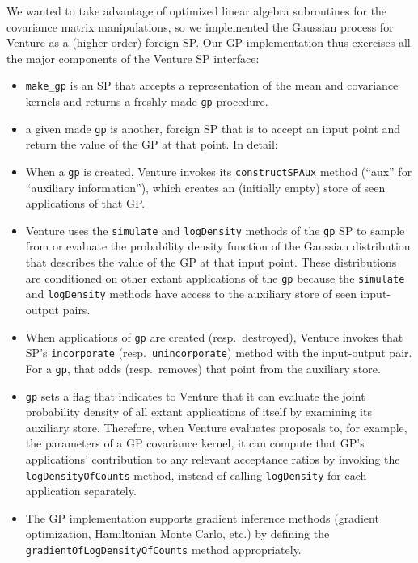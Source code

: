 We wanted to take advantage of optimized linear algebra subroutines
for the covariance matrix manipulations, so we implemented the
Gaussian process for Venture as a (higher-order) foreign \ac{SP}.
Our \ac{GP} implementation thus exercises all the major components of
the Venture \ac{SP} interface:

\begin{itemize}

  \item \texttt{make\_gp} is an \ac{SP} that accepts a representation
  of the mean and covariance kernels and returns a freshly
  made \texttt{gp} procedure.

  \item a given made \texttt{gp} is another, foreign \ac{SP} that
  is to accept an input point and return the value of the \ac{GP} at that
  point.  In detail:

  \item When a \texttt{gp} is created, Venture invokes
  its \texttt{constructSPAux} method (``aux'' for ``auxiliary
  information''), which creates an (initially empty) store of seen
  applications of that \ac{GP}.

  \item Venture uses the \texttt{simulate} and \texttt{logDensity}
  methods of the \texttt{gp} \ac{SP} to sample from or evaluate the
  probability density function of the Gaussian distribution that
  describes the value of the \ac{GP} at that input point.  These
  distributions are conditioned on other extant applications of
  the \texttt{gp} because the \texttt{simulate}
  and \texttt{logDensity} methods have access to the auxiliary store
  of seen input-output pairs.

  \item When applications of \texttt{gp} are created (resp.\
  destroyed), Venture invokes that \ac{SP}'s \texttt{incorporate}
  (resp.\ \texttt{unincorporate}) method with the input-output pair.
  For a \texttt{gp}, that adds (resp.\ removes) that point from
  the auxiliary store.

  \item \texttt{gp} sets a flag that indicates to Venture that it can
  evaluate the joint probability density of all extant applications of
  itself by examining its auxiliary store.  Therefore, when Venture
  evaluates proposals to, for example, the parameters of a \ac{GP}
  covariance kernel, it can compute that \ac{GP}'s applications'
  contribution to any relevant acceptance ratios by invoking
  the \texttt{logDensityOfCounts} method, instead of
  calling \texttt{logDensity} for each application separately.

  \item The \ac{GP} implementation supports gradient inference methods
  (gradient optimization, Hamiltonian Monte Carlo, etc.) by defining
  the \texttt{gradientOfLogDensityOfCounts} method appropriately.

\end{itemize}

